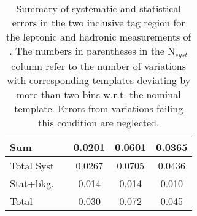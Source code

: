 \begin{table}
\begin{tabular}{lcccc}
    \hline \hline
    Sum & & 0.0201 & 0.0601 & 0.0365 \\\hline

    \hline\hline
    Total Syst &  & 0.0267  & 0.0705 & 0.0436 \\\hline
    Stat+bkg. & & 0.014 & 0.014 & 0.010 \\\hline
    
    \hline \hline
    Total &  & 0.030	& 0.072 & 0.045 \\\hline\hline
  \end{tabular}
\caption{Summary of systematic and statistical errors in the two inclusive \bt tag region for the leptonic and hadronic measurements of \fo. The numbers in parentheses in the N$_{syst}$ column refer to the number of variations with corresponding templates deviating by more than two bins w.r.t. the nominal template. Errors from variations failing this condition are neglected.}
\label{tab:systSummary_f0_old}
\end{table}

